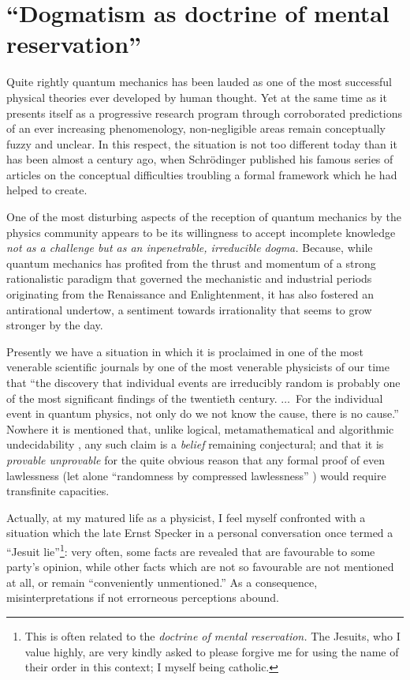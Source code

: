 \documentclass[%
 preprint,
 showpacs,
 showkeys,
 preprintnumbers,
 amsmath,amssymb,
 aps,
  pra,
  longbibliography,
 ]{revtex4-1}
\begin{document}
\section{``Dogmatism as doctrine of mental reservation''}

Quite rightly quantum mechanics has been lauded as one of the most successful physical theories ever developed by human thought.
Yet at the same time as it presents itself as a progressive research program
\cite{lakatosch} through corroborated predictions of an ever increasing phenomenology,
non-negligible areas remain conceptually fuzzy and unclear.
In this respect, the situation is not too different today than it has been almost a century ago,
when Schr\"odinger published his famous series of articles
\cite{schrodinger}
on the conceptual difficulties troubling a formal framework which he had helped to create.

One of the most disturbing aspects of the reception of quantum mechanics by the physics community appears to be
its willingness to accept incomplete knowledge {\em not as a challenge but as an inpenetrable, irreducible dogma.}
Because, while quantum mechanics has profited from the thrust and momentum of a strong rationalistic paradigm
that governed the mechanistic and industrial periods originating from the Renaissance and Enlightenment,
it has also fostered an antirational undertow, a sentiment towards
irrationality that seems to grow stronger by the day.

Presently we have a situation in which it is proclaimed in one of the most venerable scientific journals
by one of the most venerable physicists of our time that \cite{zeil-05_nature_ofQuantum}
``the discovery that individual events are
irreducibly random is probably one of the
most significant findings of the twentieth
century. $\ldots$~For the individual event in quantum physics,
not only do we not know the cause, there is no cause.''
Nowhere it is mentioned that, unlike logical, metamathematical and algorithmic undecidability \cite{davis,smullyan-92},
any such claim is a {\em belief} remaining {conjectural};
and that it is {\em provable unprovable} \cite{svozil-07-physical_unknowables} for the quite obvious reason that
any formal proof of even lawlessness (let alone ``randomness by compressed lawlessness'' \cite{calude:02})
would require transfinite capacities.


Actually, at my matured life as a physicist, I feel myself confronted with a situation
which the late Ernst Specker \cite{specker-ges,specker-60} in a personal conversation once
termed a ``Jesuit lie''\footnote{This is often related to the {\em doctrine of mental reservation.} The Jesuits, who I value highly, are very kindly asked to please forgive me for using the name of their order in this context; I myself being catholic.}:
very often, some facts are revealed that are favourable to some party's opinion,
while other facts which are not so favourable are not mentioned at all, or remain  ``conveniently unmentioned.''
As a consequence, misinterpretations if not errorneous perceptions abound.
\end{document}
